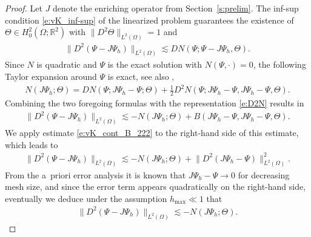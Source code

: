 \documentclass[a4paper]{amsart}
\theoremstyle{definition}
\numberwithin{equation}{section}
\numberwithin{theorem}{section}
\newcommand{\R}{\mathbb{R}}
\begin{document}
\begin{proof}
    Let $J$ denote the enriching operator from Section~\ref{s:prelim}.
    The inf-sup condition \eqref{e:vK_inf-sup} of the linearized 
    problem guarantees the existence 
    of $\Theta\in H^2_0(\Omega;\R^2)$ with 
    $\lVert D^2 \Theta \rVert_{L^2(\Omega)}=1$ and
    \begin{align*}
        \lVert D^2(\Psi-J\Psi_h)\rVert_{L^2(\Omega)}
        \lesssim DN(\Psi;\Psi-J\Psi_h,\Theta).
    \end{align*}
    Since $N$ is quadratic and $\Psi$ is the exact solution
    with $N(\Psi,\cdot)=0$, 
    the following Taylor expansion around $\Psi$ 
    is exact,
    see also \cite{CarstensenMallikNataraj2020},
    \begin{align*}
        N(J\Psi_h;\Theta)
        = DN(\Psi;J\Psi_h-\Psi;\Theta) 
          + \frac{1}{2} D^2N(\Psi;J\Psi_h-\Psi,J\Psi_h-\Psi,\Theta).
    \end{align*}
    Combining the two foregoing formulas with the representation
    \eqref{e:D2N} results in
    \begin{align*}
        \lVert D^2(\Psi-J\Psi_h)\rVert_{L^2(\Omega)}
        \lesssim -N(J\Psi_h;\Theta) + B(J\Psi_h-\Psi,J\Psi_h-\Psi,\Theta).
    \end{align*}
    We apply estimate \eqref{e:vK_cont_B_222} to the right-hand side
    of this estimate, which leads to
    \begin{align*}
        \lVert D^2(\Psi-J\Psi_h)\rVert_{L^2(\Omega)}
        \lesssim -N(J\Psi_h;\Theta) + \lVert D^2( J\Psi_h-\Psi)\rVert_{L^2(\Omega)}^2.
    \end{align*}
    From the a~priori error analysis it is known that 
    $J\Psi_h-\Psi\to 0$ for decreasing mesh size, and since the error 
    term appears quadratically on the right-hand side, eventually we
    deduce under the assumption $h_{\max}\ll1$ that
    \begin{align*}
        \lVert D^2(\Psi-J\Psi_h)\rVert_{L^2(\Omega)}
        \lesssim -N(J\Psi_h;\Theta) .
    \end{align*}
    

\end{proof}
\end{document}
